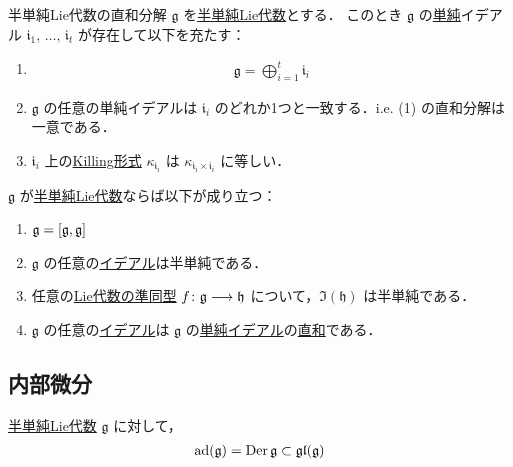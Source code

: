 \documentclass[rep_main]{subfiles}
\begin{document}
\begin{mytheo}[label=thm:semisimple-decomp]{半単純Lie代数の直和分解}
	$\mathfrak{g}$ を\hyperref[def:semisimple-LieAlg]{半単純Lie代数}とする．
	このとき $\mathfrak{g}$ の\hyperref[def:simple-LieAlg]{単純}イデアル $\mathfrak{i}_1,\, \dots,\, \mathfrak{i}_t$ が存在して以下を充たす：
	\begin{enumerate}
		\item \begin{align}
			\mathfrak{g} = \bigoplus_{i = 1}^t \mathfrak{i}_i
		\end{align}
		\item $\mathfrak{g}$ の任意の単純イデアルは $\mathfrak{i}_i$ のどれか1つと一致する．i.e. (1) の直和分解は一意である．
		\item $\mathfrak{i}_i$ 上の\hyperref[def:Killing-form]{Killing形式} $\kappa_{\mathfrak{i}_i}$ は $\kappa_{\mathfrak{i}_i \times \mathfrak{i}_i}$ に等しい．
	\end{enumerate}
	
\end{mytheo}

\begin{mycol}[label=col:semisimple-decomp]{}
	$\mathfrak{g}$ が\hyperref[def:semisimple-LieAlg]{半単純Lie代数}ならば以下が成り立つ：
	\begin{enumerate}
		\item $\mathfrak{g} = \comm{\mathfrak{g}}{\mathfrak{g}}$
		\item $\mathfrak{g}$ の任意の\hyperref[def:ideal-LieAlg]{イデアル}は半単純である．
		\item 任意の\hyperref[def:hom-LieAlg]{Lie代数の準同型} $f \colon \mathfrak{g} \longrightarrow \mathfrak{h}$ について，$\Im (\mathfrak{h})$ は半単純である．
		\item $\mathfrak{g}$ の任意の\hyperref[def:ideal-LieAlg]{イデアル}は $\mathfrak{g}$ の\hyperref[def:simple-LieAlg]{単純イデアル}の\hyperref[prop:subvec-directsum]{直和}である．
	\end{enumerate}
	
\end{mycol}

\subsection{内部微分}

\begin{mytheo}[label=thm:semisimple-innerdv]{}
	\hyperref[def:semisimple-LieAlg]{半単純Lie代数} $\mathfrak{g}$ に対して，
	\begin{align}
		\operatorname{ad}(\mathfrak{g}) = \operatorname{Der} \mathfrak{g} \subset \mathfrak{gl}(\mathfrak{g})
	\end{align}
\end{mytheo}
\end{document}
